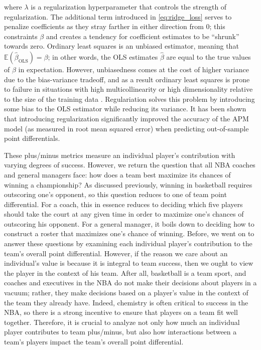 where $\lambda$ is a regularization hyperparameter that controls the strength of
regularization. The additional term introduced in \eqref{eq:ridge_loss} serves to
penalize coefficients as they stray farther in either direction from 0; this
constraints $\beta$ and creates a tendency for coefficient estimates to be “shrunk”
towards zero. Ordinary least squares is an unbiased estimator, meaning that
$\mathbb{E} \left(\hat\beta_{\text{OLS}}\right) = \beta$; in other words, the OLS
estimates $\hat\beta$ are equal to the true values of $\beta$ in expectation.
However, unbiasedness comes at the cost of higher variance due to the bias-variance
tradeoff, and as a result ordinary least squares is prone to failure in situations
with high multicollinearity or high dimensionality relative to the size of the
training data \cite{Ridge,Bishop}. Regulariation solves this problem by introducing
some bias to the OLS estimator while reducing its variance. It has been shown that
introducing regularization significantly improved the accuracy of the APM model (as
measured in root mean squared error) when predicting out-of-sample point
differentials\cite{Sill}.

These plus/minus metrics measure an individual player's contribution with varying
degrees of success. However, we return the question that all NBA coaches and general
managers face: how does a team best maximize its chances of winning a championship?
As discussed previously, winning in basketball requires outscoring one's opponent,
so this question reduces to one of team point differential. For a coach, this in
essence reduces to deciding which five players should take the court at any given
time in order to maximize one's chances of outscoring his opponent. For a general
manager, it boils down to deciding how to construct a roster that maximizes one's
chance of winning. Before, we went on to answer these questions by examining each
individual player's contribution to the team's overall point differential. However,
if the reason we care about an individual's value is because it is integral to team
success, then we ought to view the player in the context of his team. After all,
basketball is a team sport, and coaches and executives in the NBA do not make their
decisions about players in a vacuum; rather, they make decisions based on a player’s
value in the context of the team they already have. Indeed, chemistry is often
critical to success in the NBA, so there is a strong incentive to ensure that
players on a team fit well together. Therefore, it is crucial to analyze not only
how much an individual player contributes to team plus/minus, but also how
interactions between a team's players impact the team's overall point differential.

